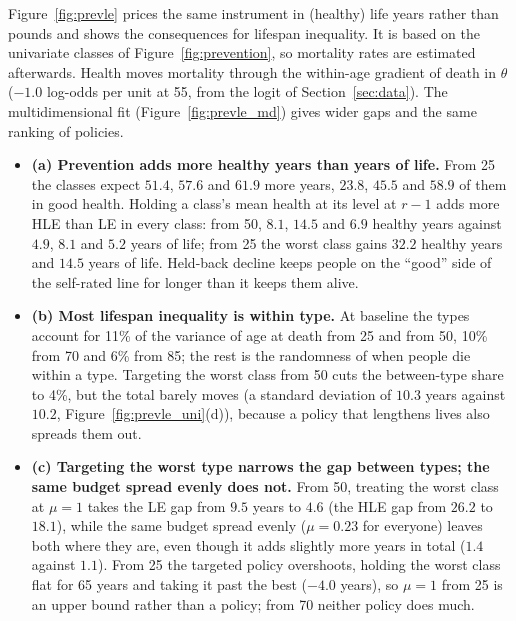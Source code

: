 \documentclass[11pt]{article}
\begin{document}
	Figure~\ref{fig:prevle} prices the same instrument in (healthy) life years rather than pounds and shows the consequences for lifespan inequality. It is based on the univariate classes of Figure~\ref{fig:prevention}, so mortality rates are estimated afterwards. Health moves mortality through the within-age gradient of death in $\theta$ ($-1.0$ log-odds per unit at 55, from the logit of Section~\ref{sec:data}). The multidimensional fit (Figure~\ref{fig:prevle_md}) gives wider gaps and the same ranking of policies.

	\begin{itemize}
		\item \textbf{(a) Prevention adds more healthy years than years of life.} From 25 the classes expect $51.4$, $57.6$ and $61.9$ more years, $23.8$, $45.5$ and $58.9$ of them in good health. Holding a class's mean health at its level at $r-1$ adds more HLE than LE in every class: from 50, $8.1$, $14.5$ and $6.9$ healthy years against $4.9$, $8.1$ and $5.2$ years of life; from 25 the worst class gains $32.2$ healthy years and $14.5$ years of life. Held-back decline keeps people on the ``good'' side of the self-rated line for longer than it keeps them alive.
		\item \textbf{(b) Most lifespan inequality is within type.} At baseline the types account for 11\% of the variance of age at death from 25 and from 50, 10\% from 70 and 6\% from 85; the rest is the randomness of when people die within a type. Targeting the worst class from 50 cuts the between-type share to 4\%, but the total barely moves (a standard deviation of $10.3$ years against $10.2$, Figure~\ref{fig:prevle_uni}(d)), because a policy that lengthens lives also spreads them out.
		\item \textbf{(c) Targeting the worst type narrows the gap between types; the same budget spread evenly does not.} From 50, treating the worst class at $\mu=1$ takes the LE gap from $9.5$ years to $4.6$ (the HLE gap from $26.2$ to $18.1$), while the same budget spread evenly ($\mu=0.23$ for everyone) leaves both where they are, even though it adds slightly more years in total ($1.4$ against $1.1$). From 25 the targeted policy overshoots, holding the worst class flat for 65 years and taking it past the best ($-4.0$ years), so $\mu=1$ from 25 is an upper bound rather than a policy; from 70 neither policy does much.

\end{itemize}
\end{document}
